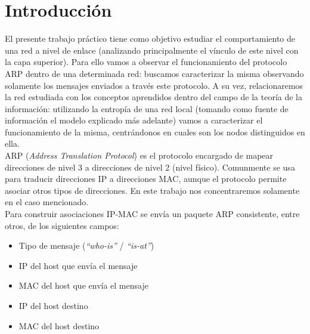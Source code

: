 \section{Introducci\'on}



El presente trabajo pr\'actico tiene como objetivo estudiar el comportamiento de una red a nivel de enlace (analizando principalmente el v\'inculo de este nivel con la capa superior). Para ello vamos a observar el funcionamiento del protocolo ARP dentro de una determinada red: buscamos caracterizar la misma observando solamente los mensajes enviados a trav\'es este protocolo. A su vez, relacionaremos la red estudiada con los conceptos aprendidos dentro del campo de la teor\'ia de la informaci\'on: utilizando la entrop\'ia de una red local (tomando como fuente de informaci\'on el modelo explicado m\'as adelante) vamos a caracterizar el funcionamiento de la misma, centr\'andonos en cuales son los nodos distinguidos en ella.\\

ARP (\emph{Address Translation Protocol}) es el protocolo encargado de mapear direcciones de nivel 3 a direcciones de nivel 2 (nivel f\'isico). Comunmente se usa para traducir direcciones IP a direcciones MAC, aunque el protocolo permite asociar otros tipos de direcciones. En este trabajo nos concentraremos solamente en el caso mencionado. \\


Para construir asociaciones IP-MAC se env\'ia un paquete ARP consistente, entre otros, de los siguientes campos:

\begin{itemize}
 \item Tipo de mensaje (\emph{``who-is''} / \emph{``is-at''})
 \item IP del host que env\'ia el mensaje
 \item MAC del host que env\'ia el mensaje
 \item IP del host destino
 \item MAC del host destino
\end{itemize}

